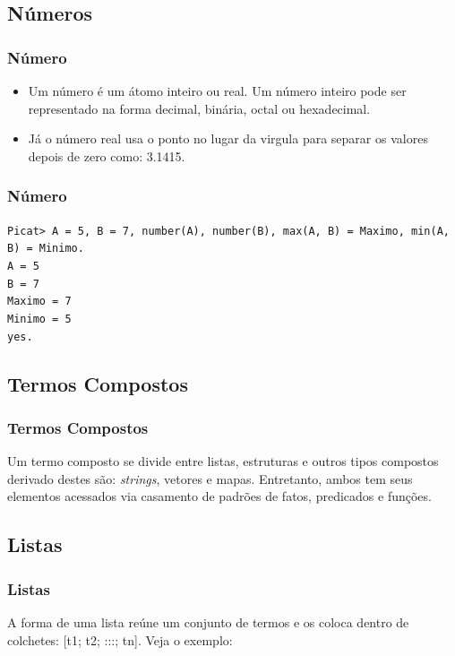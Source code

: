 \documentclass[10pt]{beamer}
\begin{document}
\subsection{Números}
\begin{frame}
    \frametitle{Número}
    \begin{itemize}
     \item Um número é um átomo inteiro ou real. Um número inteiro pode ser representado na forma decimal, binária, octal ou hexadecimal. 
     \item Já o número real usa o ponto no lugar da virgula para separar os valores depois de zero como: 3.1415.
    \end{itemize}
\end{frame}


\begin{frame}
    \frametitle{Número}
    \texttt{Picat> A = 5, B = 7, number(A), number(B),
    max(A, B) = Maximo, min(A, B) = Minimo.}\\
  
    \texttt{A = 5}\\
    \texttt{B = 7}\\
    \texttt{Maximo = 7}\\
    \texttt{Minimo = 5}\\
    \texttt{yes.}
\end{frame}


\subsection{Termos Compostos}
\begin{frame}
    \frametitle{Termos Compostos}
    Um termo composto se divide entre listas,  estruturas e outros tipos compostos derivado destes são: 
    \textit{strings}, vetores e mapas. Entretanto, ambos tem seus elementos acessados via casamento de padrões de fatos, predicados e funções.
\end{frame}

\subsection{Listas}
\begin{frame}
    \frametitle{Listas}
    A forma de uma lista reúne um conjunto de termos e os coloca dentro de colchetes: [t1; t2; :::; tn]. Veja o exemplo:
\end{frame}
\end{document}
